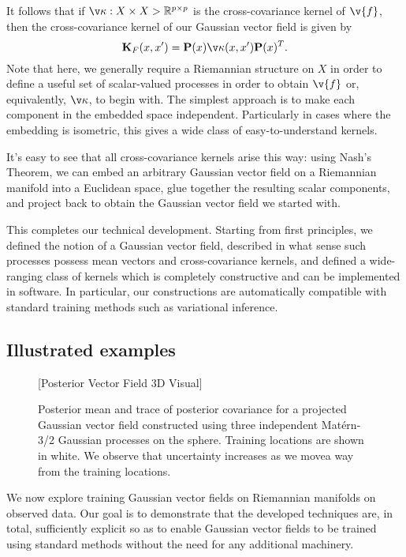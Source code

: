 \documentclass[11pt]{book}
\begin{document}
It follows that if $\v\kappa : X \x X \-> \R^{p \x p}$ is the cross-covariance kernel of $\v{f}$, then the cross-covariance kernel of our Gaussian vector field is given by 
\[
\m{K}_F(x,x') = \m{P}(x) \v\kappa(x,x') \m{P}(x)^T
.    
\]
Note that here, we generally require a Riemannian structure on $X$ in order to define a useful set of scalar-valued processes in order to obtain $\v{f}$ or, equivalently, $\v\kappa$, to begin with.
The simplest approach is to make each component in the embedded space independent.
Particularly in cases where the embedding is isometric, this gives a wide class of easy-to-understand kernels.

It's easy to see that all cross-covariance kernels arise this way: using Nash's Theorem, we can embed an arbitrary Gaussian vector field on a Riemannian manifold into a Euclidean space, glue together the resulting scalar components, and project back to obtain the Gaussian vector field we started with.

This completes our technical development. 
Starting from first principles, we defined the notion of a Gaussian vector field, described in what sense such processes possess mean vectors and cross-covariance kernels, and defined a wide-ranging class of kernels which is completely constructive and can be implemented in software.
In particular, our constructions are automatically compatible with standard training methods such as variational inference.

\subsection{Illustrated examples}

\begin{figure}
\vspace*{10ex}
[Posterior Vector Field 3D Visual]
\vspace*{10ex}
\caption{Posterior mean and trace of posterior covariance for a projected Gaussian vector field constructed using three independent Matérn-3/2 Gaussian processes on the sphere. Training locations are shown in white. We observe that uncertainty increases as we movea way from the training locations.}
\label{fig:posterior-vector-field}
\end{figure}

We now explore training Gaussian vector fields on Riemannian manifolds on observed data. 
Our goal is to demonstrate that the developed techniques are, in total, sufficiently explicit so as to enable Gaussian vector fields to be trained using standard methods without the need for any additional machinery.
\end{document}
